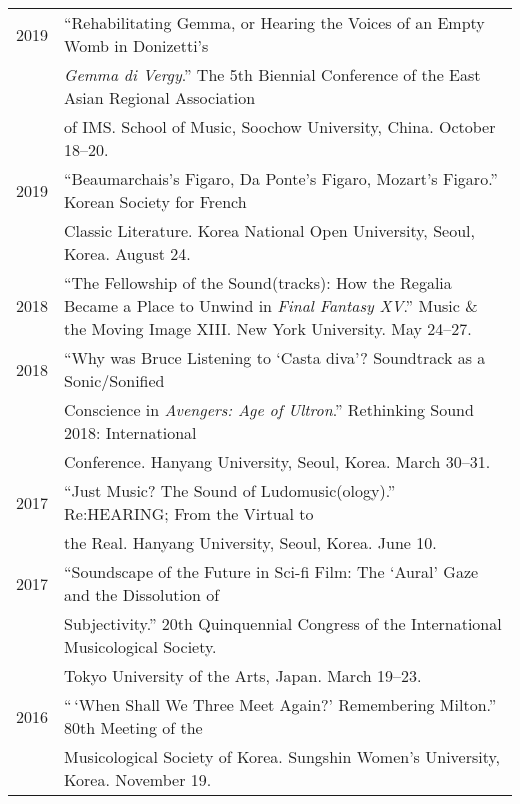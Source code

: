 \documentclass[a4paper,11pt]{article}
\begin{document}
  \hspace*{-0.25cm}
  \begin{tabular}{p{2.5cm} p{12.5cm}}
    2019 & “Rehabilitating Gemma, or Hearing the Voices of an Empty Womb in
    Donizetti’s\\
    & \textit{Gemma di Vergy}.” The 5th Biennial Conference of the East Asian
    Regional Association\\
    & of IMS. School of Music, Soochow University, China. October 18–20.\\[2mm]
  
    2019 & “Beaumarchais’s Figaro, Da Ponte’s Figaro, Mozart’s Figaro.” Korean
    Society for French\\
    & Classic Literature. Korea National Open University, Seoul, Korea. August
    24.\\[2mm]
  
    2018 & “The Fellowship of the Sound(tracks): How the Regalia Became a Place
    to Unwind in \textit{Final Fantasy XV}.” Music \& the Moving Image XIII.
    New York University. May 24--27.\\[2mm]
  
    2018 & “Why was Bruce Listening to ‘Casta diva’? Soundtrack as a
    Sonic/Sonified\\
    & Conscience in \textit{Avengers: Age of Ultron}.” Rethinking Sound 2018:
    International\\
    & Conference. Hanyang University, Seoul, Korea. March 30--31.\\[2mm]
  
    2017 & “Just Music? The Sound of Ludomusic(ology).” Re:HEARING; From the
    Virtual to\\
    & the Real. Hanyang University, Seoul, Korea. June 10.\\[2mm]
  
    2017 & “Soundscape of the Future in Sci-fi Film: The ‘Aural’ Gaze and the
    Dissolution of\\
    & Subjectivity.” 20th Quinquennial Congress of the International
    Musicological Society.\\
    & Tokyo University of the Arts, Japan. March 19--23.\\[2mm]
  
    2016 & “\,‘When Shall We Three Meet Again?’ Remembering Milton.” 80th
    Meeting of the\\
    & Musicological Society of Korea. Sungshin Women’s University, Korea.
    November 19.\\[2mm]


\end{tabular}
\end{document}
